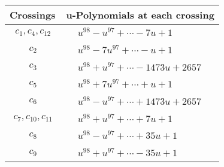 \documentclass[1p]{elsarticle_modified}
\theoremstyle{definition}
\begin{document}
\begin{tabular}{m{50pt}|m{274pt}}
Crossings & \hspace{64pt}u-Polynomials at each crossing \\
\hline $$\begin{aligned}c_{1},c_{4},c_{12}\end{aligned}$$&$\begin{aligned}
&u^{98}- u^{97}+\cdots-7 u+1
\end{aligned}$\\
\hline $$\begin{aligned}c_{2}\end{aligned}$$&$\begin{aligned}
&u^{98}-7 u^{97}+\cdots- u+1
\end{aligned}$\\
\hline $$\begin{aligned}c_{3}\end{aligned}$$&$\begin{aligned}
&u^{98}+u^{97}+\cdots-1473 u+2657
\end{aligned}$\\
\hline $$\begin{aligned}c_{5}\end{aligned}$$&$\begin{aligned}
&u^{98}+7 u^{97}+\cdots+u+1
\end{aligned}$\\
\hline $$\begin{aligned}c_{6}\end{aligned}$$&$\begin{aligned}
&u^{98}- u^{97}+\cdots+1473 u+2657
\end{aligned}$\\
\hline $$\begin{aligned}c_{7},c_{10},c_{11}\end{aligned}$$&$\begin{aligned}
&u^{98}+u^{97}+\cdots+7 u+1
\end{aligned}$\\
\hline $$\begin{aligned}c_{8}\end{aligned}$$&$\begin{aligned}
&u^{98}- u^{97}+\cdots+35 u+1
\end{aligned}$\\
\hline $$\begin{aligned}c_{9}\end{aligned}$$&$\begin{aligned}
&u^{98}+u^{97}+\cdots-35 u+1
\end{aligned}$\\
\hline
\end{tabular}\newpage\renewcommand{\arraystretch}{1}
\end{document}
